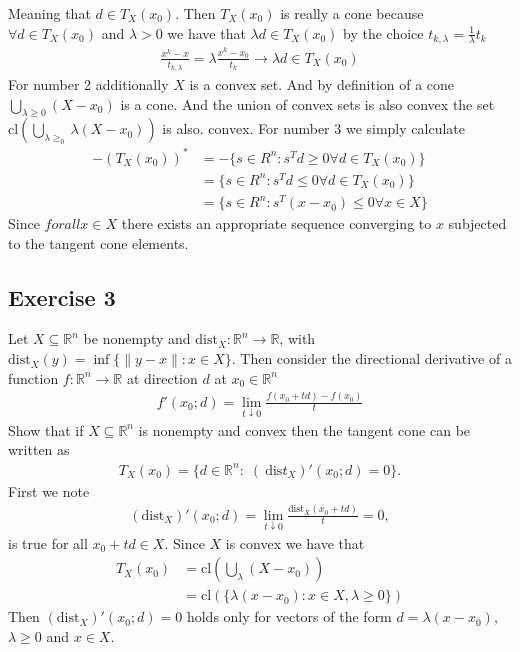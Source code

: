 Meaning that $d \in T_X(x_0)$.
Then
$T_X(x_0)$  is really a cone because $\forall d \in T_X(x_0)$ and $\lambda
>0$ we have that $\lambda d \in T_X(x_0)$ by the choice $t_{k,\lambda}=
\frac{1}{\lambda}t_k$
\begin{align}
    \frac{x^{k}- x}{t_{k,\lambda}} = \lambda \frac{x^{k}-x_0}{t_k}\to
    \lambda d \in T_X(x_0)
\end{align}
For number 2 additionally $X$ is a convex set. And by
definition of a cone $\bigcup_{\lambda \ge 0}(X-x_0)$ is a cone. And the
union of convex sets is also convex the set
$\text{cl}\left(\bigcup_{\lambda\ge_0} \lambda(X-x_0 ) \right)$ is also.
convex.
For number 3 we simply calculate
\begin{align}
    -\left( T_X(x_0) \right)^{*}
    &= -\{s \in R^{n}: s^{T}d \ge 0 \forall d \in T_X(x_0)\}\\
    &= \{s \in R^{n}: s^{T}d \le 0 \forall d \in T_X(x_0)\}\\
    &= \{s \in R^{n}: s^{T}(x-x_0) \le 0 \forall x \in X\}
\end{align}
Since $forall x \in X$ there exists an appropriate sequence converging to $x$
subjected to the tangent cone elements.
\subsection{Exercise 3}
Let $X \subseteq \mathbb{R}^{n}$ be nonempty and $\text{dist}_X: \mathbb{R}^{n}
\to \mathbb{R}$, with $\text{dist}_X(y) = \inf \{\|y-x\|: x\in X\}$. Then consider the
directional derivative of a function $f: \mathbb{R}^{n}\to \mathbb{R}$ at
direction $d$ at $x_0 \in \mathbb{R}^{n}$
\begin{align}
    f'(x_0; d) = \lim_{t \downarrow 0} \frac{f(x_0 + t d) - f(x_0)}{t}
\end{align}
Show that if $X \subseteq \mathbb{R}^{n}$ is nonempty and convex then the
tangent cone can be written as
\begin{align}
    T_X(x_0) = \{d \in \mathbb{R}^{n}:\; \left( \ \text{dis}t_X
    \right)'(x_0;d) = 0\}.
\end{align}
First we note
\begin{align}
    (\text{dist}_X)'(x_0;d) = \lim_{t \downarrow 0} \frac{\text{dist}_X(x_0+t
    d)}{t} = 0,
\end{align}
is true for all $x_0 + t d \in X$. Since $X$ is convex we have that
\begin{align}
    T_X(x_0) &= \text{cl}\left( \bigcup_{\lambda}\left( X-x_0 \right)  \right)
    \\
             &= \text{cl}\left( \{\lambda (x - x_0): x\in X, \lambda \ge 0\}  \right)
\end{align}
Then $(\text{dist}_X)'(x_0;d) = 0$ holds only for vectors of the form
$d = \lambda (x - x_0)$, $\lambda \ge 0$ and $x \in X$.
